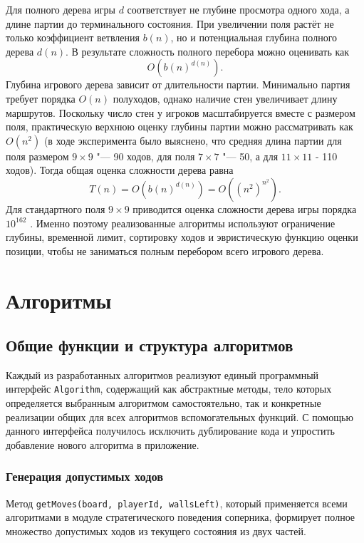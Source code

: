 \documentclass[a4paper,12pt]{diplom}
\begin{document}
Для полного дерева игры $d$ соответствует не глубине просмотра одного хода, а длине партии до терминального состояния. При увеличении поля растёт не только коэффициент ветвления $b(n)$, но и потенциальная глубина полного дерева $d(n)$. В результате сложность полного перебора можно оценивать как
\[
    O(b(n)^{d(n)}).
\]
Глубина игрового дерева зависит от длительности партии. Минимально партия требует порядка $O(n)$ полуходов, однако наличие стен увеличивает длину маршрутов. Поскольку число стен у игроков масштабируется вместе с размером поля, практическую верхнюю оценку глубины партии можно рассматривать как $O(n^2)$ (в ходе эксперимента было выяснено, что средняя длина партии для поля размером $9 \times 9$ "--- 90 ходов, для поля $7 \times 7$ "--- 50, а для $11 \times 11$ - 110 ходов). Тогда общая оценка сложности дерева равна
\[
T(n) = O(b(n)^{d(n)}) = O((n^2)^{n^2}).
\]
Для стандартного поля $9 \times 9$ приводится оценка сложности дерева игры порядка $10^{162}$ \cite{Respall:2018}. Именно поэтому реализованные алгоритмы используют ограничение глубины, временной лимит, сортировку ходов и эвристическую функцию оценки позиции, чтобы не заниматься полным перебором всего игрового дерева.

\chapter{Алгоритмы}

\section{Общие функции и структура алгоритмов}

Каждый из разработанных алгоритмов реализуют единый программный интерфейс \texttt{Algorithm}, содержащий как абстрактные методы, тело которых определяется выбранным алгоритмом самостоятельно, так и конкретные реализации общих для всех алгоритмов вспомогательных функций. С помощью данного интерфейса получилось исключить дублирование кода и упростить добавление нового алгоритма в приложение.

\subsection*{Генерация допустимых ходов}

Метод \texttt{getMoves(board, playerId, wallsLeft)}, который применяется всеми алгоритмами в модуле стратегического поведения соперника, формирует полное множество допустимых ходов из текущего состояния из двух частей.
\end{document}
